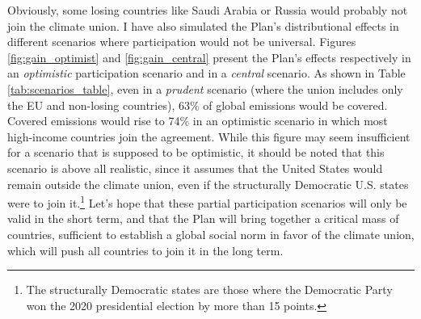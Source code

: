 \documentclass[a5paper,english,openany]{memoir}
\begin{document}
Obviously, some losing countries like Saudi Arabia or Russia would probably not join the climate union. I have also simulated the Plan's distributional effects in different scenarios where participation would not be universal. Figures \ref{fig:gain_optimist} and \ref{fig:gain_central} present the Plan's effects respectively in an \textit{optimistic} participation scenario and in a \textit{central} scenario. As shown in Table \ref{tab:scenarios_table}, even in a \textit{prudent} scenario (where the union includes only the EU and non-losing countries), %
63\%  %
of global emissions would be covered. Covered emissions would rise to 74\% %
in an optimistic scenario in which %
most high-income countries join the agreement. While this figure may seem insufficient for a scenario that is supposed to be optimistic, it should be noted that this scenario is above all realistic, since it assumes that the United States would remain outside the climate union, even if the structurally Democratic U.S. states were to join it.\footnote{The structurally Democratic states are those where the Democratic Party won the 2020 presidential election by more than 15 points.} Let's hope %
that these partial participation scenarios will only be valid in the short term, and that the Plan will bring together a critical mass of countries, sufficient to establish a global social norm in favor of the climate union, which will push all countries to join it in the long term.
\end{document}

